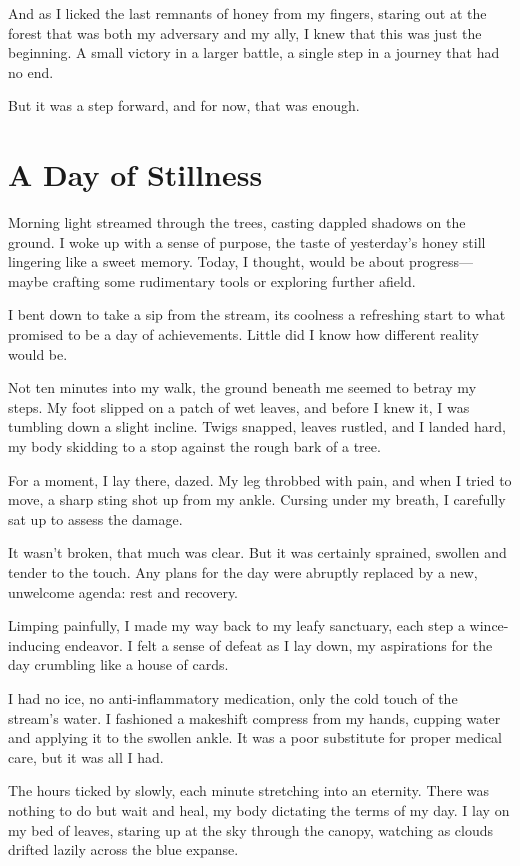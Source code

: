 \documentclass[]{article}
\begin{document}
And as I licked the last remnants of honey from my fingers, staring out at the forest that was both my adversary and my ally, I knew that this was just the beginning. A small victory in a larger battle, a single step in a journey that had no end.

But it was a step forward, and for now, that was enough.

\section{A Day of Stillness}


Morning light streamed through the trees, casting dappled shadows on the ground. I woke up with a sense of purpose, the taste of yesterday's honey still lingering like a sweet memory. Today, I thought, would be about progress—maybe crafting some rudimentary tools or exploring further afield.

I bent down to take a sip from the stream, its coolness a refreshing start to what promised to be a day of achievements. Little did I know how different reality would be.

Not ten minutes into my walk, the ground beneath me seemed to betray my steps. My foot slipped on a patch of wet leaves, and before I knew it, I was tumbling down a slight incline. Twigs snapped, leaves rustled, and I landed hard, my body skidding to a stop against the rough bark of a tree.

For a moment, I lay there, dazed. My leg throbbed with pain, and when I tried to move, a sharp sting shot up from my ankle. Cursing under my breath, I carefully sat up to assess the damage.

It wasn't broken, that much was clear. But it was certainly sprained, swollen and tender to the touch. Any plans for the day were abruptly replaced by a new, unwelcome agenda: rest and recovery.

Limping painfully, I made my way back to my leafy sanctuary, each step a wince-inducing endeavor. I felt a sense of defeat as I lay down, my aspirations for the day crumbling like a house of cards.

I had no ice, no anti-inflammatory medication, only the cold touch of the stream's water. I fashioned a makeshift compress from my hands, cupping water and applying it to the swollen ankle. It was a poor substitute for proper medical care, but it was all I had.

The hours ticked by slowly, each minute stretching into an eternity. There was nothing to do but wait and heal, my body dictating the terms of my day. I lay on my bed of leaves, staring up at the sky through the canopy, watching as clouds drifted lazily across the blue expanse.
\end{document}
